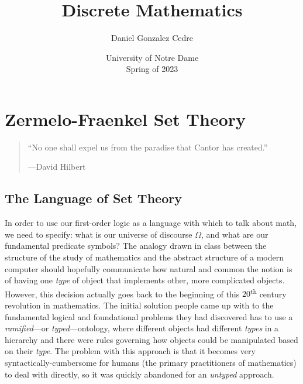 





\title{Discrete Mathematics}
\author{Daniel Gonzalez Cedre}
\date{University of Notre Dame \\ Spring of 2023}
\maketitle

\setcounter{chapter}{2}
\chapter{Zermelo-Fraenkel Set Theory}
\begin{quote}
    ``No one shall expel us from the paradise that Cantor has created.''
    \begin{flushright}
        ---David Hilbert
    \end{flushright}
\end{quote}

\section{The Language of Set Theory}
In order to use our first-order logic as a language with which to talk about math,
we need to specify: what is our universe of discourse \(\Omega\), and what are our fundamental predicate symbols?
The analogy drawn in class between the structure of the study of mathematics
and the abstract structure of a modern computer
should hopefully communicate how natural and common the notion is of having one \emph{type} of object
that implements other, more complicated objects.
However, this decision actually goes back to the beginning of
this \(20\)\textsuperscript{th} century revolution in mathematics.
The initial solution people came up with to the fundamental logical and foundational problems they had discovered
has to use a \emph{ramified}---or \emph{typed}---ontology,
where different objects had different \emph{types} in a hierarchy and there were rules governing how objects
could be manipulated based on their \emph{type}.
The problem with this approach is that it becomes very syntactically-cumbersome for humans
(the primary practitioners of mathematics) to deal with directly,
so it was quickly abandoned for an \emph{untyped} approach.

